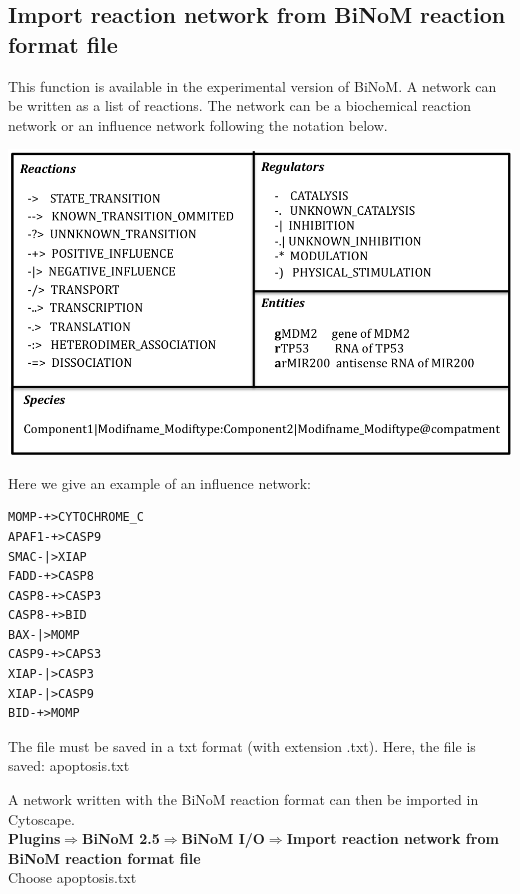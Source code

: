 \subsection{Import reaction network from BiNoM reaction format file} \label{Import_reaction_format}
This function is available in the experimental version of BiNoM. 
A network can be written as a list of reactions. The network can be a biochemical reaction network or an influence network following the notation below.

\includegraphics[width=1\textwidth]{graphics/syntax_text_network.png} 

Here we give an example of an influence network: 
\begin{verbatim}
MOMP-+>CYTOCHROME_C
APAF1-+>CASP9
SMAC-|>XIAP
FADD-+>CASP8
CASP8-+>CASP3
CASP8-+>BID
BAX-|>MOMP
CASP9-+>CAPS3
XIAP-|>CASP3
XIAP-|>CASP9
BID-+>MOMP
\end{verbatim}

The file must be saved in a txt format (with extension .txt). Here, the file is saved: apoptosis.txt

A network written with the BiNoM reaction format can then be imported in Cytoscape. \\
\textbf{Plugins$\Rightarrow$BiNoM 2.5$\Rightarrow$BiNoM I/O$\Rightarrow$Import reaction network from BiNoM reaction format file}\\

Choose apoptosis.txt

